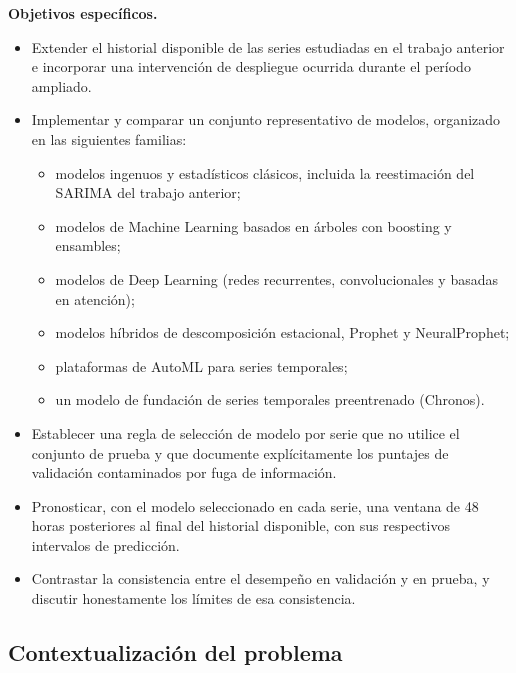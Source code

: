 \textbf{Objetivos específicos.}
\begin{itemize}
  \item Extender el historial disponible de las series estudiadas en el trabajo anterior e incorporar una
  intervención de despliegue ocurrida durante el período ampliado.
  \item Implementar y comparar un conjunto representativo de modelos, organizado en las siguientes
  familias:
  \begin{itemize}
    \item modelos ingenuos y estadísticos clásicos, incluida la reestimación del SARIMA del trabajo anterior;
    \item modelos de Machine Learning basados en árboles con boosting y ensambles;
    \item modelos de Deep Learning (redes recurrentes, convolucionales y basadas en atención);
    \item modelos híbridos de descomposición estacional, Prophet y NeuralProphet;
    \item plataformas de AutoML para series temporales;
    \item un modelo de fundación de series temporales preentrenado (Chronos).
  \end{itemize}
  \item Establecer una regla de selección de modelo por serie que no utilice el conjunto de prueba y que
  documente explícitamente los puntajes de validación contaminados por fuga de información.
  \item Pronosticar, con el modelo seleccionado en cada serie, una ventana de 48 horas posteriores al
  final del historial disponible, con sus respectivos intervalos de predicción.
  \item Contrastar la consistencia entre el desempeño en validación y en prueba, y discutir honestamente
  los límites de esa consistencia.
\end{itemize}

\subsection{Contextualización del problema}

